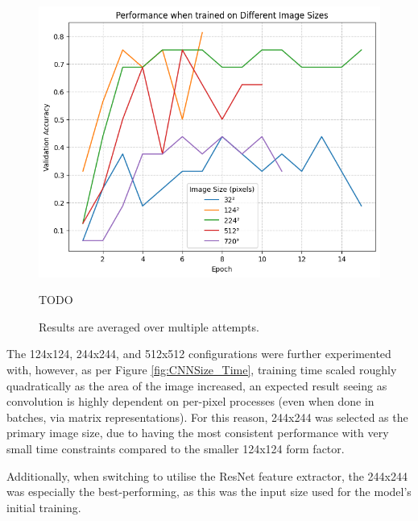                         \begin{figure}[h]
                            \centering
                            \includegraphics[width=\textwidth]{images/CNNSize_Perf.png}
                            \caption{TODO}
                            \label{fig:CNNSize_Perf}
                            \caption*{Results are averaged over multiple attempts.}
                        \end{figure}
    
                        The 124x124, 244x244, and 512x512 configurations were further experimented with, however, as per Figure \ref{fig:CNNSize_Time}, training time scaled roughly quadratically as the area of the image increased, an expected result seeing as convolution is highly dependent on per-pixel processes (even when done in batches, via matrix representations). For this reason, 244x244 was selected as the primary image size, due to having the most consistent performance with very small time constraints compared to the smaller 124x124 form factor.
    
                        Additionally, when switching to utilise the ResNet feature extractor, the 244x244 was especially the best-performing, as this was the input size used for the model's initial training.
                
